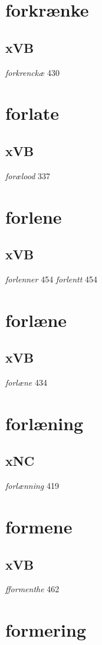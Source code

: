 \documentclass[a4paper,twocolumn]{article}
\begin{document}
\section{forkrænke}
\label{sec:org8c86872}
\subsection{xVB}
\label{sec:orgdc0c37a}
\emph{forkrenckæ} 430 
\section{forlate}
\label{sec:org7b6af7f}
\subsection{xVB}
\label{sec:org70d8aa2}
\emph{forælood} 337 
\section{forlene}
\label{sec:org88806de}
\subsection{xVB}
\label{sec:org1a691cd}
\emph{forlenner} 454 \emph{forlentt} 454 
\section{forlæne}
\label{sec:orgd989df5}
\subsection{xVB}
\label{sec:orgdd4cf5d}
\emph{forlæne} 434 
\section{forlæning}
\label{sec:orgf57a1ac}
\subsection{xNC}
\label{sec:org5af7d26}
\emph{forlænning} 419 
\section{formene}
\label{sec:org993ae76}
\subsection{xVB}
\label{sec:orgc9e51ab}
\emph{fformenthe} 462 
\section{formering}
\label{sec:orgb566664}
\end{document}

